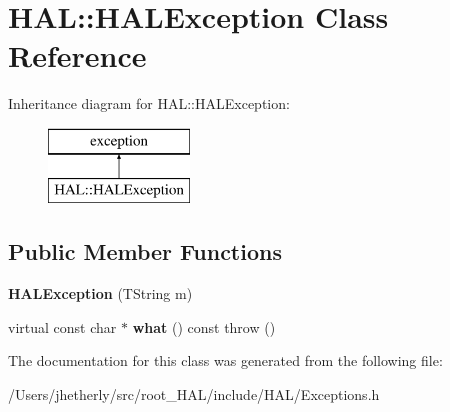 \hypertarget{class_h_a_l_1_1_h_a_l_exception}{\section{H\-A\-L\-:\-:H\-A\-L\-Exception Class Reference}
\label{class_h_a_l_1_1_h_a_l_exception}
}
Inheritance diagram for H\-A\-L\-:\-:H\-A\-L\-Exception\-:\begin{figure}[H]
\begin{center}
\leavevmode
\includegraphics[height=2.000000cm]{class_h_a_l_1_1_h_a_l_exception}
\end{center}
\end{figure}
\subsection*{Public Member Functions}
\begin{DoxyCompactItemize}
\item 
\hypertarget{class_h_a_l_1_1_h_a_l_exception_a4f6662db7819d278a642abc8edf6b064}{{\bfseries H\-A\-L\-Exception} (T\-String m)}\label{class_h_a_l_1_1_h_a_l_exception_a4f6662db7819d278a642abc8edf6b064}

\item 
\hypertarget{class_h_a_l_1_1_h_a_l_exception_aaf6b8a29e7bb09721dd7aaa7b7a9b078}{virtual const char $\ast$ {\bfseries what} () const   throw ()}\label{class_h_a_l_1_1_h_a_l_exception_aaf6b8a29e7bb09721dd7aaa7b7a9b078}

\end{DoxyCompactItemize}


The documentation for this class was generated from the following file\-:\begin{DoxyCompactItemize}
\item 
/\-Users/jhetherly/src/root\-\_\-\-H\-A\-L/include/\-H\-A\-L/Exceptions.\-h\end{DoxyCompactItemize}
